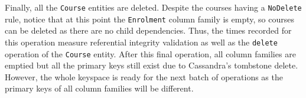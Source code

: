 Finally,  all the \texttt{Course} entities are deleted.  Despite the courses
having a \texttt{NoDelete} rule,  notice that at this point the
\texttt{Enrolment} column family is empty,  so courses can be deleted as there
are no child dependencies.  Thus,  the times recorded for this operation measure
referential integrity validation as well as the \texttt{delete} operation
of the \texttt{Course} entity.  After this final operation,  all column families
are emptied but all the primary keys still exist due to Cassandra's tombstone
delete.  However,  the whole keyspace is ready for the next batch of operations as
the primary keys of all column families will be different. 
	
	